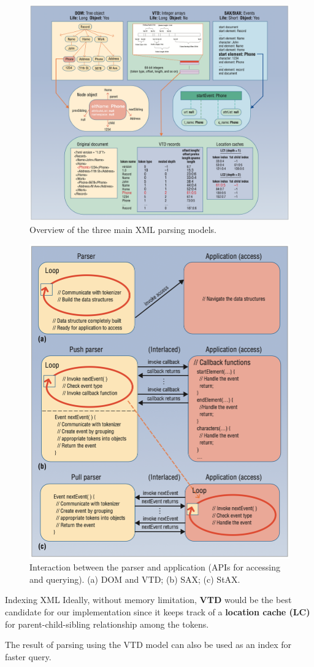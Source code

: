\documentclass{beamer}
\begin{document}
\begin{frame}
    \begin{figure}[htbp]
        \centering
        \includegraphics[width=0.7\linewidth]{res/xml-parsing-models.png}
        \caption{Overview of the three main XML parsing models.}
        \label{fig:xml-parsing-models}
    \end{figure}
\end{frame}

\begin{frame}
    \begin{figure}[htbp]
        \centering
        \includegraphics[width=0.5\linewidth]{res/xml-parsing-interaction.png}
        \caption{Interaction between the parser and application (APIs for accessing and querying). (a) DOM and VTD; (b) SAX; (c) StAX.}
        \label{fig:xml-parsing-interaction}
    \end{figure}
\end{frame}

\begin{frame}{Indexing XML}
    Ideally, without memory limitation, \textbf{VTD} would be the best candidate for our implementation since it keeps track of a \textbf{location cache (LC)} for parent-child-sibling relationship among the tokens.

    The result of parsing using the VTD model can also be used as an index for faster query.
\end{frame}
\end{document}

